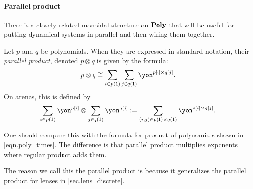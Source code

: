 \documentclass[Book-Poly]{subfiles}
\begin{document}
\paragraph{Parallel product}
There is a closely related monoidal structure on $\textbf{Poly}$ that will be useful for putting dynamical systems in parallel and then wiring them together.

\begin{definition}\label{def.dirichlet}
Let $p$ and $q$ be polynomials. When they are expressed in standard notation, their \emph{parallel product}, denoted $p\otimes q$ is given by the formula:
\begin{equation}\label{eqn.dirichlet_def}
p\otimes q\cong\sum_{i\in p(\1)}\sum_{j\in q(\1)}\yon^{p[i]\times q[j]}.
\end{equation}
On arenas, this is defined by
\begin{equation}\label{eqn.parallel_product_dependent}
\sum_{i \in p(\1)}\yon^{p[i]} \otimes \sum_{j \in q(\1)}\yon^{q[j]} := \sum_{(i,j) \in p(\1) \times q(\1)}\yon^{p[i]\times q[j]}.
\end{equation}
\end{definition}

One should compare this with the formula for product of polynomials shown in \eqref{eqn.poly_times}. The difference is that parallel product multiplies exponents where regular product adds them.

\begin{remark}
  The reason we call this the parallel product is because it generalizes the
  parallel product for lenses in \cref{sec.lens_discrete}.
\end{remark}
\end{document}
